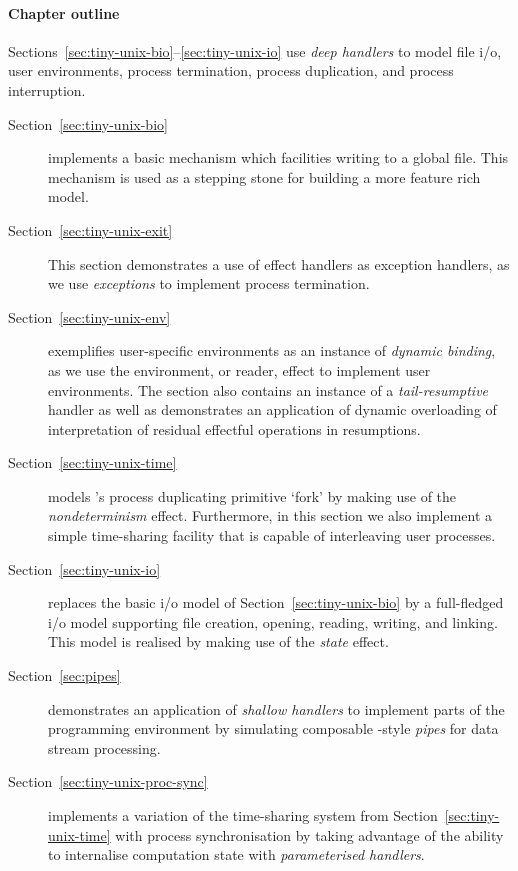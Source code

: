 \documentclass[12pt,phd,lfcs,twoside,openright,logo,leftchapter,normalheadings]{infthesis}
\theoremstyle{plain}
\theoremstyle{definition}
\begin{document}
\paragraph{Chapter outline}
Sections~\ref{sec:tiny-unix-bio}--\ref{sec:tiny-unix-io} use \emph{deep
handlers} to model file i/o, user environments, process termination,
process duplication, and process interruption.
%
\begin{description}
\item[Section~\ref{sec:tiny-unix-bio}] implements a basic
  mechanism which facilities writing to a global file. This mechanism
  is used as a stepping stone for building a more feature rich model.
\item[Section~\ref{sec:tiny-unix-exit}] This section demonstrates a
  use of effect handlers as exception handlers, as we use \emph{exceptions}
  to implement process termination.
\item[Section~\ref{sec:tiny-unix-env}] exemplifies
  user-specific environments as an instance of \emph{dynamic binding},
  as we use the environment, or reader, effect to implement user
  environments. The section also contains an instance of a
  \emph{tail-resumptive} handler as well as demonstrates an
  application of dynamic overloading of interpretation of residual
  effectful operations in resumptions.
\item[Section~\ref{sec:tiny-unix-time}] models \UNIX{}'s
  process duplicating primitive `fork' by making use of the
  \emph{nondeterminism} effect. Furthermore, in this section we also
  implement a simple time-sharing facility that is capable of
  interleaving user processes.
\item[Section~\ref{sec:tiny-unix-io}] replaces the basic
  i/o model of Section~\ref{sec:tiny-unix-bio} by a full-fledged i/o
  model supporting file creation, opening, reading, writing, and
  linking. This model is realised by making use of the \emph{state}
  effect.
\item[Section~\ref{sec:pipes}] demonstrates an application of
  \emph{shallow handlers} to implement parts of the \UNIX{}
  programming environment by simulating composable \UNIX{}-style
  \emph{pipes} for data stream processing.
\item[Section~\ref{sec:tiny-unix-proc-sync}] implements a variation of
  the time-sharing system from Section~\ref{sec:tiny-unix-time} with
  process synchronisation by taking advantage of the ability to
  internalise computation state with \emph{parameterised handlers}.
\end{description}
\end{document}
